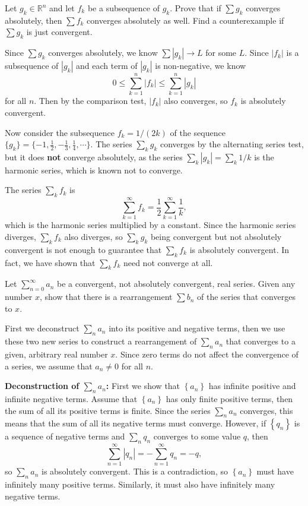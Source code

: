 \documentclass[10pt]{amsart}
\newenvironment{exercise}[1]{%
        \vspace{10mm}
        \renewcommand\themanualtheoreminner{#1}%
  \manualtheoreminner
}\hrulefill{\endmanualtheoreminner}
\begin{document}
\begin{exercise}{Page 318, Ex. 15}
	Let $g_k \in \mathbb{R}^n$ and let $f_k$ be a subsequence of $g_k$. Prove that if $\sum g_k$ converges absolutely, then $\sum f_k$ converges absolutely as well. Find a counterexample if $\sum g_k$ is just convergent.
\end{exercise}

Since $\sum g_k$ converges absolutely, we know $\sum |g_k| \to L$ for some $L$. Since $|f_k|$ is a subsequence of $|g_k|$ and each term of $|g_k|$ is non-negative, we know
\[
	0 \leq \sum_{k=1}^n |f_k| \leq \sum_{k=1}^n |g_k|
\] for all $n$. Then by the comparison test, $|f_k|$ also converges, so $f_k$ is absolutely convergent.

Now consider the subsequence $f_k = 1/(2k)$ of the sequence $\{g_k\} = \{-1, \frac{1}{2} , -\frac{1}{3} , \frac{1}{4}, \cdots\}$. The series $\sum_k g_k$ converges by the alternating series test, but it does \textbf{not} converge absolutely, as the series $\sum_k |g_k| = \sum_k 1/k$ is the harmonic series, which is known not to converge.

The series $\sum_k f_k$ is \[\sum_{k=1}^{\infty} f_k = \frac{1}{2}  \sum_{k=1}^\infty \frac{1}{k},\] which is the harmonic series multiplied by a constant. Since the harmonic series diverges, $\sum_k f_k$ also diverges, so $\sum_k g_k$ being convergent but not absolutely convergent is not enough to guarantee that $\sum_k f_k$ is absolutely convergent. In fact, we have shown that $\sum_k f_k$ need not converge at all.

\begin{exercise}{Page 318, Ex. 17}
	Let $\sum_{n=0}^{\infty} a_n$ be a convergent, not absolutely convergent, real series. Given any number $x$, show that there is a rearrangement $\sum b_n$ of the series that converges to $x$.
\end{exercise}

First we deconstruct $\sum_n a_n$ into its positive and negative terms, then we use these two new series to construct a rearrangement of $\sum_n a_n$ that converges to a given, arbitrary real number $x$. Since zero terms do not affect the convergence of a series, we assume that $a_n \neq 0$ for all $n$.

\textbf{Deconstruction of $\sum_{n} a_n$:} First we show that $\left\{ a_n \right\}$ has infinite positive and infinite negative terms. Assume that $\left\{ a_n \right\}$ has only finite positive terms, then the sum of all its positive terms is finite. Since the series $\sum_n a_n$ converges, this means that the sum of all its negative terms must converge. However, if $\left\{ q_n \right\}$ is a sequence of negative terms and $\sum_n q_n$ converges to some value $q$, then
\[
\sum_{n=1}^{\infty} |q_n| = - \sum_{n=1}^{\infty} q_n = -q,
\] so $\sum_n a_n$ is absolutely convergent. This is a contradiction, so $\left\{ a_n \right\}$ must have infinitely many positive terms. Similarly, it must also have infinitely many negative terms.
\end{document}
